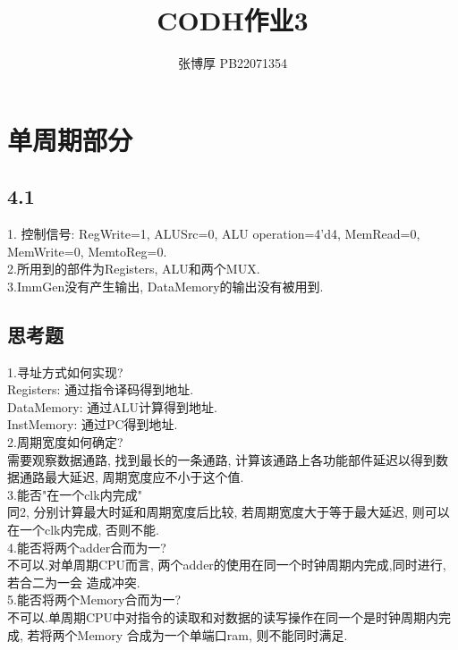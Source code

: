 \documentclass{article}
\title{CODH作业3}
\author{张博厚 PB22071354}
\date{}
\begin{document}
\maketitle
\section*{单周期部分}
\subsection*{4.1}
1. 控制信号: RegWrite=1, ALUSrc=0, ALU operation=4'd4, MemRead=0, MemWrite=0,
MemtoReg=0.\\
2.所用到的部件为Registers, ALU和两个MUX.\\
3.ImmGen没有产生输出, DataMemory的输出没有被用到.
\subsection*{思考题}
1.寻址方式如何实现?\\
\hspace*{0.5cm}Registers: 通过指令译码得到地址.\\
\hspace*{0.5cm}DataMemory: 通过ALU计算得到地址.\\
\hspace*{0.5cm}InstMemory: 通过PC得到地址.\\
2.周期宽度如何确定?\\
\hspace*{0.5cm}需要观察数据通路, 找到最长的一条通路, 计算该通路上各功能部件延迟以得到数据通路最大延迟, 
周期宽度应不小于这个值.\\
3.能否"在一个clk内完成"\\
\hspace*{0.5cm}同2, 分别计算最大时延和周期宽度后比较, 若周期宽度大于等于最大延迟, 则可以在一个clk内完成,
否则不能.\\
4.能否将两个adder合而为一?\\
\hspace*{0.5cm}不可以.对单周期CPU而言, 两个adder的使用在同一个时钟周期内完成,同时进行, 若合二为一会
造成冲突.\\
5.能否将两个Memory合而为一?\\
\hspace*{0.5cm}不可以.单周期CPU中对指令的读取和对数据的读写操作在同一个是时钟周期内完成, 若将两个Memory
合成为一个单端口ram, 则不能同时满足.
\end{document}
